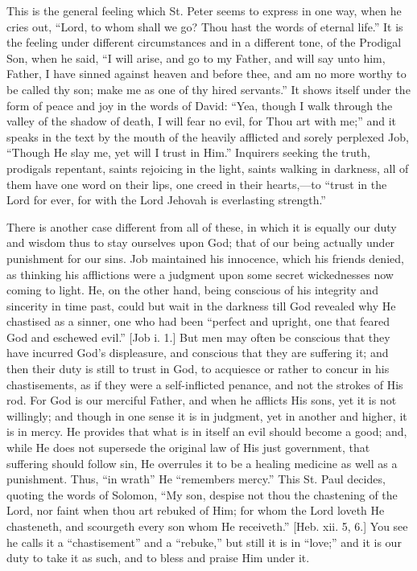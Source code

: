 This is the general feeling which St. Peter seems to express in one
way, when he cries out, ``Lord, to whom shall we go? Thou hast the
words of eternal life.'' It is the feeling under different
circumstances and in a different tone, of the Prodigal Son, when he
said, ``I will arise, and go to my Father, and will say unto him,
Father, I have sinned against heaven and before thee, and am no more
worthy to be called thy son; make me as one of thy hired
servants.'' It shows itself under the form of peace and joy in the
words of David: ``Yea, though I walk through the valley of the
shadow of death, I will fear no evil, for Thou art with me;'' and
it speaks in the text by the mouth of the heavily afflicted and sorely
perplexed Job, ``Though He slay me, yet will I trust in Him.''
Inquirers seeking the truth, prodigals repentant, saints rejoicing in
the light, saints walking in darkness, all of them have one word on
their lips, one creed in their hearts,—to ``trust in the Lord
for ever, for with the Lord Jehovah is everlasting strength.''

There is another case different from all of these, in which it is
equally our duty and wisdom thus to stay ourselves upon God; that of
our being actually under punishment for our sins. Job maintained his
innocence, which his friends denied, as thinking his afflictions were
a judgment upon some secret wickednesses now coming to light. He, on
the other hand, being conscious of his integrity and sincerity in time
past, could but wait in the darkness till God revealed why He
chastised as a sinner, one who had been ``perfect and upright, one
that feared God and eschewed evil.'' [Job i. 1.] But men may often
be conscious that they have incurred God's displeasure, and conscious
that they are suffering it; and then their duty is still to trust in
God, to acquiesce or rather to concur in his chastisements, as if they
were a self-inflicted penance, and not the strokes of His rod. For God
is our merciful Father, and when he afflicts His sons, yet it is not
willingly; and though in one sense it is in judgment, yet in another
and higher, it is in mercy. He provides that what is in itself an evil
should become a good; and, while He does not supersede the original
law of His just government, that suffering should follow sin, He
overrules it to be a healing medicine as well as a punishment. Thus,
``in wrath'' He ``remembers mercy.'' This St. Paul
decides, quoting the words of Solomon, ``My son, despise not thou
the chastening of the Lord, nor faint when thou art rebuked of Him;
for whom the Lord loveth He chasteneth, and scourgeth every son whom
He receiveth.'' [Heb. xii. 5, 6.] You see he calls it a
``chastisement'' and a ``rebuke,'' but still it is in
``love;'' and it is our duty to take it as such, and to bless
and praise Him under it.

